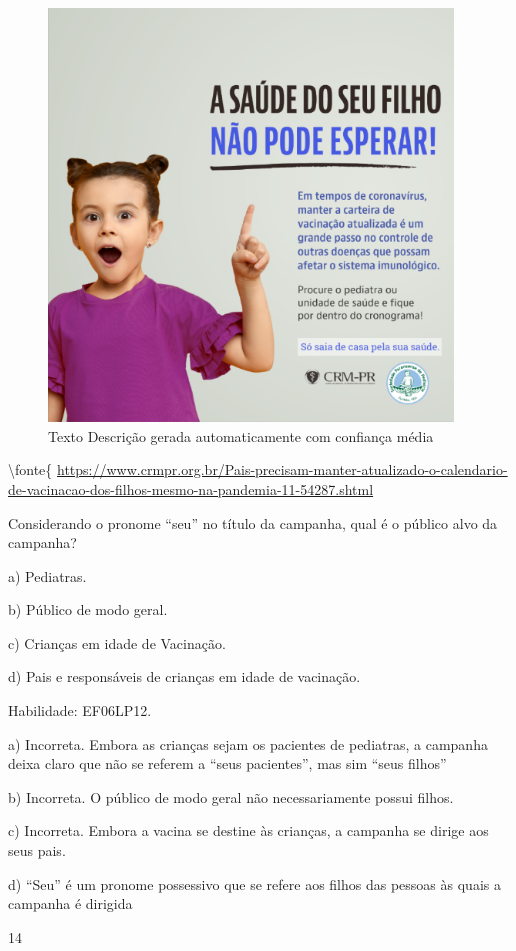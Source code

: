 \begin{figure}
\centering
\includegraphics[width=4.23378in,height=4.3141in]{./imgSAEB_6_POR/media/image36.png}
\caption{Texto Descrição gerada automaticamente com confiança média}
\end{figure}

\textbackslash fonte\{
\url{https://www.crmpr.org.br/Pais-precisam-manter-atualizado-o-calendario-de-vacinacao-dos-filhos-mesmo-na-pandemia-11-54287.shtml}

Considerando o pronome ``seu'' no título da campanha, qual é o público
alvo da campanha?

a) Pediatras.

b) Público de modo geral.

c) Crianças em idade de Vacinação.

d) Pais e responsáveis de crianças em idade de vacinação.

Habilidade: EF06LP12.

a) Incorreta. Embora as crianças sejam os pacientes de pediatras, a
campanha deixa claro que não se referem a ``seus pacientes'', mas sim
``seus filhos''

b) Incorreta. O público de modo geral não necessariamente possui filhos.

c) Incorreta. Embora a vacina se destine às crianças, a campanha se
dirige aos seus pais.

d) ``Seu'' é um pronome possessivo que se refere aos filhos das pessoas
às quais a campanha é dirigida

\num{14}

